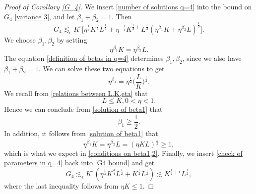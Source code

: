 \documentclass[11pt]{amsart}
\numberwithin{equation}{section}
\theoremstyle{definition}
\theoremstyle{proposition}
\begin{document}
\begin{proof}[Proof of Corollary \ref{G_4}]
We insert \eqref{number of solutions q=4} into the bound on $G_4$ \eqref{variance 3}, and let $\beta_1+\beta_2=1$. Then
\begin{equation}  \label{G4 bound}
G_4\lesssim_\epsilon K^\epsilon\Big[ \eta^{\frac{1}{4}}K^{\frac{3}{4}}L^{\frac{1}{2}}+\eta^{-\frac{1}{4}}  K^{\frac{1}{4}+}L^{\frac{1}{4}}(\eta^{\beta_1}K+\eta^{\beta_2}L)^{\frac{1}{2}} \Big].    
\end{equation}
We choose $\beta_1,\beta_2$ by setting 
\begin{equation}  \label{definition of betas in q=4}
\eta^{\beta_1}K=\eta^{\beta_2}L.    
\end{equation}
The equation \eqref{definition of betas in q=4} determines $\beta_1,\beta_2$, since we also have $\beta_1+\beta_2=1$. We can solve these two equations to get
\begin{equation} \label{solution of beta1}
\eta^{\beta_1}=\eta^{\frac{1}{2}} \Big(\frac{L}{K}\Big)^{\frac{1}{2}}.
\end{equation}
We recall from \eqref{relations between L,K,eta} that
\[
L\le K, 0<\eta<1.
\]
Hence we can conclude from \eqref{solution of beta1} that 
\[
\beta_1 \ge \frac{1}{2}. 
\]
In addition,  it follows from \eqref{solution of beta1} that 
\begin{equation}  \label{check of parameters in q=4}
\eta^{\beta_1}K=\eta^{\beta_2}L= (\eta KL)^\frac{1}{2}\ge 1,    
\end{equation}
which is what we expect in \eqref{conditions on beta1,2}.
Finally, we insert \eqref{check of parameters in q=4} back into \eqref{G4 bound} and get 
\[
G_4\lesssim_\epsilon K^\epsilon ( \eta^{\frac{1}{4}} K^{\frac{3}{4}}L^{\frac{1}{2}}+K^{\frac{1}{2}}L^{\frac{1}{2}}) \lesssim K^{\frac{1}{2}+\epsilon}L^{\frac{1}{2}},
\]
where the last inequality follows from $\eta K\le  1$. 
\end{proof}
\end{document}

